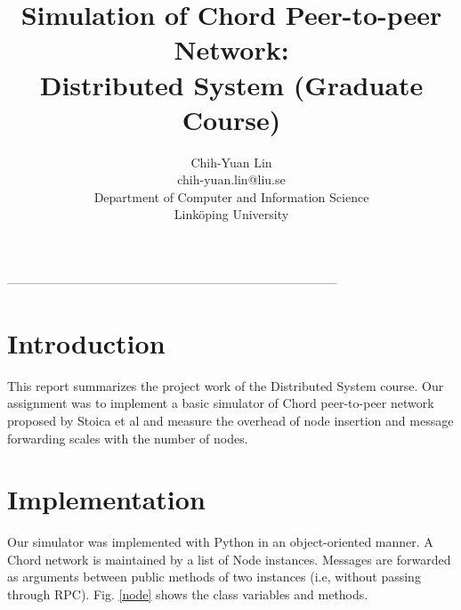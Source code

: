 \documentclass{article}
\title{Simulation of Chord Peer-to-peer Network: \\
Distributed System (Graduate Course)}
\author{Chih-Yuan Lin \\
chih-yuan.lin@liu.se \\
Department of Computer and Information Science\\
Linköping University\\}
\begin{document}
\maketitle
\begin{center}
--------------------------------------------------------------------------------\\
\end{center}

\section*{Introduction}
This report summarizes the project work of the Distributed System course. Our assignment was to implement a basic simulator of Chord peer-to-peer network proposed by Stoica et al \cite{paper, report} and measure the overhead of node insertion and message forwarding scales with the number of nodes.

\section*{Implementation}
Our simulator was implemented with Python in an object-oriented manner. A Chord network is maintained by a list of Node instances. Messages are forwarded as arguments between public methods of two instances (i.e, without passing through RPC). Fig. \ref{node} shows the class variables and methods. 
\end{document}
